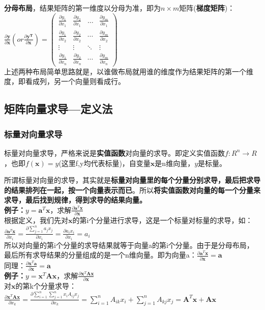     \textbf{分母布局}，结果矩阵的第一维度以分母为准，即为$n\times m$矩阵(\textbf{梯度矩阵})： \\
    $\frac{\partial \mathbf{y}}{\partial \mathbf{x}}(or \frac{\partial \mathbf{y^{T}}}{\partial \mathbf{x}})=\left(\begin{array}{cccc}{\frac{\partial y_{1}}{\partial x_{1}}} & {\frac{\partial y_{2}}{\partial x_{1}}} & {\ldots} & {\frac{\partial y_{m}}{\partial x_{1}}} \\ {\frac{\partial y_{1}}{\partial x_{2}}} & {\frac{\partial y_{2}}{\partial x_{2}}} & {\cdots} & {\frac{\partial y_{m}}{\partial x_{2}}} \\ {\vdots} & {\vdots} & {\ddots} & {\vdots} \\ {\frac{\partial y_{1}}{\partial x_{n}}} & {\frac{\partial y_{2}}{\partial x_{n}}} & {\cdots} & {\frac{\partial y_{m}}{\partial x_{n}}}\end{array}\right)$
    \\
    上述两种布局简单思路就是，以谁做布局就用谁的维度作为结果矩阵的第一个维度，即看成列，另一个向量则看成行。

    \subsection{矩阵向量求导---定义法}
    \subsubsection{标量对向量求导}
    标量对向量求导，严格来说是\textbf{实值函数}对向量的求导。即定义实值函数$f: R^{n} \rightarrow R$，也即$f( \bm{x} )=y$(这里f,y均代表标量)，自变量$\bm{x}$是n维向量，$y$是标量。


    所谓标量对向量的求导，其实就是\textbf{标量对向量里的每个分量分别求导，最后把求导的结果排列在一起，按一个向量表示而已}。所以\textbf{将实值函数对向量的每一个分量来求导，最后找到规律，得到求导的结果向量。}
    \\
    \textbf{例子：}$y=\mathbf{a}^{T} \mathbf{x}$，求解$\frac{\partial \mathbf{a}^{T} \mathbf{x}}{\partial \mathbf{x}}$
    \\
    根据定义，我们先对$\bm{x}$的第i个分量进行求导，这是一个标量对标量的求导，如：$\frac{\partial \mathbf{a}^{T} \mathbf{x}}{\partial x_{i}}=\frac{\partial \sum_{j=1}^{n} a_{j} x_{j}}{\partial x_{i}}=\frac{\partial a_{i} x_{i}}{\partial x_{i}}=a_{i}$
    \\
    所以对向量的第i个分量的求导结果就等于向量a的第i个分量。由于是分母布局，最后所有求导结果的分量组成的是一个n维向量。即为向量a：$\frac{\partial \mathbf{a}^{T} \mathbf{x}}{\partial \mathbf{x}}=\mathbf{a}$
    \\
    同理：$\frac{\partial \mathbf{x}^{T} \mathbf{a}}{\partial \mathbf{x}}=\mathbf{a}$
    \\
    \textbf{例子：}$y=\mathbf{x}^{T} \mathbf{A} \mathbf{x}$，求解$\frac{\partial \mathbf{x}^{T} \mathbf{A} \mathbf{x}}{\partial \mathbf{x}}$
    \\
    对$\bm{x}$的第k个分量求导：\\
    $\frac{\partial \mathbf{x}^{T} \mathbf{A} \mathbf{x}}{\partial x_{k}}=\frac{\partial \sum_{i=1}^{n} \sum_{j=1}^{n} x_{i} A_{i j} x_{j}}{\partial x_{k}}=\sum_{i=1}^{n} A_{i k} x_{i}+\sum_{j=1}^{n} A_{k j} x_{j}=\mathbf{A}^{T} \mathbf{x}+\mathbf{A} \mathbf{x}$
